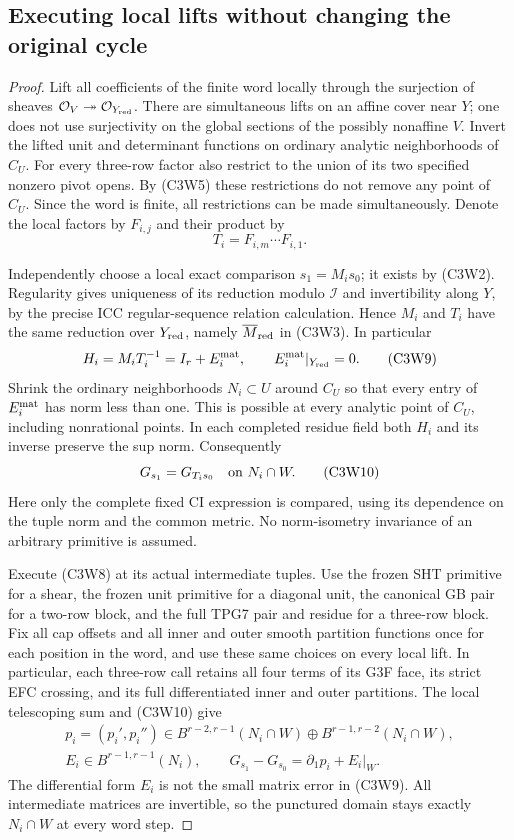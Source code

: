 \subsection{Executing local lifts without changing the original cycle}

\begin{proof}
Lift all coefficients of the finite word locally through the
surjection of sheaves
$\mathcal O_V\twoheadrightarrow\mathcal O_{Y_{\rm red}}$.
There are simultaneous lifts on an affine cover near $Y$; one
does not use surjectivity on the global sections of the possibly
nonaffine $V$.  Invert the lifted unit and determinant functions
on ordinary analytic neighborhoods of $C_U$.  For every
three-row factor also restrict to the union of its two specified
nonzero pivot opens.  By (C3W5) these restrictions do not remove
any point of $C_U$.  Since the word is finite, all restrictions
can be made simultaneously.  Denote the local factors by
$F_{i,j}$ and their product by
\[
                         T_i=F_{i,m}\cdots F_{i,1}.
 \tag{C3W8}
\]

Independently choose a local exact comparison $s_1=M_i s_0$;
it exists by (C3W2).  Regularity gives uniqueness of its reduction
modulo $\mathcal I$ and invertibility along $Y$, by the precise
ICC regular-sequence relation calculation.  Hence $M_i$ and
$T_i$ have the same reduction over $Y_{\rm red}$, namely
$\overline M_{\rm red}$ in (C3W3).  In particular
\[
       H_i=M_iT_i^{-1}=I_r+E_i^{\rm mat},\qquad
                  E_i^{\rm mat}|_{Y_{\rm red}}=0.
 \tag{C3W9}
\]
Shrink the ordinary neighborhoods $N_i\subset U$ around $C_U$
so that every entry of $E_i^{\rm mat}$ has norm less than one.
This is possible at every analytic point of $C_U$, including
nonrational points.  In each completed residue field both
$H_i$ and its inverse preserve the sup norm.  Consequently
\[
                 G_{s_1}=G_{T_i s_0}
                           \quad\hbox{on }N_i\cap W.
 \tag{C3W10}
\]
Here only the complete fixed CI expression is compared, using
its dependence on the tuple norm and the common metric.  No
norm-isometry invariance of an arbitrary primitive is assumed.

Execute (C3W8) at its actual intermediate tuples.  Use the frozen
SHT primitive for a shear, the frozen unit primitive for a diagonal
unit, the canonical GB pair for a two-row block, and the full
TPG7 pair and residue for a three-row block.  Fix all cap offsets
and all inner and outer smooth partition functions once for each
position in the word, and use these same choices on every local
lift.  In particular, each three-row call retains all four terms
of its G3F face, its strict EFC crossing, and its full differentiated
inner and outer partitions.  The local telescoping sum and
(C3W10) give
\[
 \begin{gathered}
 p_i=(p_i',p_i'')\in
 B^{r-2,r-1}(N_i\cap W)\oplus B^{r-1,r-2}(N_i\cap W),\\
 E_i\in B^{r-1,r-1}(N_i),\qquad
 G_{s_1}-G_{s_0}=\partial_1p_i+E_i|_W.
 \end{gathered}
 \tag{C3W11}
\]
The differential form $E_i$ is not the small matrix error in
(C3W9).  All intermediate matrices are invertible, so the
punctured domain stays exactly $N_i\cap W$ at every word step.


\end{proof}
